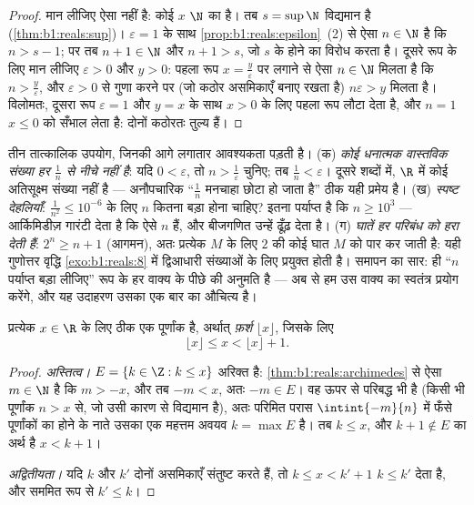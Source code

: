 \begin{proof}
मान लीजिए ऐसा नहीं है: कोई $x$ $\N$ का  है। तब $s = \sup \N$
विद्यमान है (\cref{thm:b1:reals:sup})। $\varepsilon = 1$ के साथ
\cref{prop:b1:reals:epsilon}~(2) से ऐसा $n \in \N$ है कि $n > s - 1$; पर तब
$n + 1 \in \N$ और $n + 1 > s$, जो $s$ के  होने का विरोध करता है।
दूसरे रूप के लिए मान लीजिए $\varepsilon > 0$ और $y > 0$: पहला रूप $x =
\frac{y}{\varepsilon}$ पर लगाने से ऐसा $n \in \N$ मिलता है कि $n >
\frac{y}{\varepsilon}$, और $\varepsilon > 0$ से गुणा करने पर (जो कठोर
असमिकाएँ बनाए रखता है) $n\varepsilon > y$ मिलता है। विलोमतः, दूसरा रूप
$\varepsilon = 1$ और $y = x$ के साथ $x > 0$ के लिए पहला रूप लौटा देता है, और
$n = 1$ $x \leq 0$ को सँभाल लेता है: दोनों  कठोरतः तुल्य हैं।
\end{proof}

\begin{example}[आर्किमिडीज़ काम पर]\label{ex:b1:reals:archimedeswork}
तीन तात्कालिक उपयोग, जिनकी आगे लगातार आवश्यकता पड़ती है। (क) \emph{कोई
धनात्मक वास्तविक संख्या हर $\frac1n$ से नीचे नहीं है}: यदि $0 <
\varepsilon$, तो $n > \frac1\varepsilon$ चुनिए; तब $\frac1n < \varepsilon$।
दूसरे शब्दों में, $\R$ में कोई अतिसूक्ष्म संख्या नहीं है --- अनौपचारिक
``$\frac1n$ मनचाहा छोटा हो जाता है'' ठीक यही प्रमेय है। (ख) \emph{स्पष्ट
देहलियाँ}: $\frac{1}{n^2} \leq 10^{-6}$ के लिए $n$ कितना बड़ा होना चाहिए?
इतना पर्याप्त है कि $n \geq 10^3$ --- आर्किमिडीज़ गारंटी देता है कि ऐसे $n$
हैं, और बीजगणित उन्हें ढूँढ़ देता है। (ग) \emph{घातें हर परिबंध को हरा देती
हैं}: $2^n \geq n + 1$ (आगमन), अतः प्रत्येक $M$ के लिए $2$ की कोई घात $M$ को
पार कर जाती है: यही गुणोत्तर वृद्धि \cref{exo:b1:reals:8} में द्विआधारी
संख्याओं के लिए प्रयुक्त होती है। समापन का सार:  ही ``$n$
पर्याप्त बड़ा लीजिए'' रूप के हर वाक्य के पीछे की अनुमति है --- अब से हम उस
वाक्य का स्वतंत्र प्रयोग करेंगे, और यह उदाहरण उसका एक बार का औचित्य है।
\end{example}

\begin{theorem}[फ़र्श फलन]\label{thm:b1:reals:floor}
प्रत्येक $x \in \R$ के लिए ठीक एक पूर्णांक है, अर्थात्
\emph{फ़र्श} $\lfloor x \rfloor$, जिसके लिए
\[
\lfloor x \rfloor \leq x < \lfloor x \rfloor + 1 .
\]
\end{theorem}

\begin{proof}
\emph{अस्तित्व।}  $E = \{k \in \Z : k \leq x\}$ अरिक्त है:
\cref{thm:b1:reals:archimedes} से ऐसा $m \in \N$ है कि $m > -x$, और तब $-m <
x$, अतः $-m \in E$। वह ऊपर से परिबद्ध भी है (किसी भी पूर्णांक $n > x$ से, जो
उसी कारण से विद्यमान है), अतः परिमित परास $\intint{-m}{n}$ में फँसे
पूर्णांकों का  होने के नाते उसका एक महत्तम अवयव $k = \max E$ है। तब
$k \leq x$, और $k + 1 \notin E$ का अर्थ है $x < k + 1$।

\emph{अद्वितीयता।} यदि $k$ और $k'$ दोनों असमिकाएँ संतुष्ट करते हैं, तो $k
\leq x < k' + 1$ $k \leq k'$ देता है, और सममित रूप से $k' \leq k$।
\end{proof}

